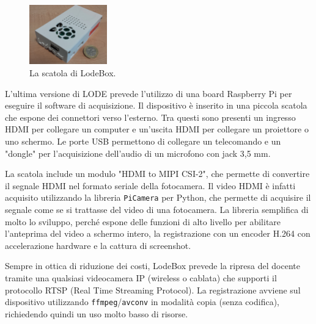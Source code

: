 \begin{figure}
	\vspace{-12pt}
	\includegraphics[width=0.3\textwidth]{res/lodebox}
	\caption{\label{fig:lodebox} La scatola di LodeBox.}
\end{figure}

L'ultima versione di LODE prevede l'utilizzo di una board Raspberry Pi per eseguire il software di acquisizione. Il dispositivo è inserito in una piccola scatola che espone dei connettori verso l'esterno. Tra questi sono presenti un ingresso HDMI per collegare un computer e un'uscita HDMI per collegare un proiettore o uno schermo. Le porte USB permettono di collegare un telecomando e un "dongle" per l'acquisizione dell'audio di un microfono con jack 3,5 mm.

La scatola include un modulo "HDMI to MIPI CSI-2", che permette di convertire il segnale HDMI nel formato seriale della fotocamera. Il video HDMI è infatti acquisito utilizzando la libreria \texttt{PiCamera} per Python, che permette di acquisire il segnale come se si trattasse del video di una fotocamera. La libreria semplifica di molto lo sviluppo, perché espone delle funzioni di alto livello per abilitare l'anteprima del video a schermo intero, la registrazione con un encoder H.264\footnotemark{} con accelerazione hardware e la cattura di screenshot.


Sempre in ottica di riduzione dei costi, LodeBox prevede la ripresa del docente tramite una qualsiasi videocamera IP (wireless o cablata) che supporti il protocollo RTSP (Real Time Streaming Protocol). La registrazione avviene sul dispositivo utilizzando \texttt{ffmpeg}/\texttt{avconv}\footnotemark{} in modalità copia (senza codifica), richiedendo quindi un uso molto basso di risorse.


